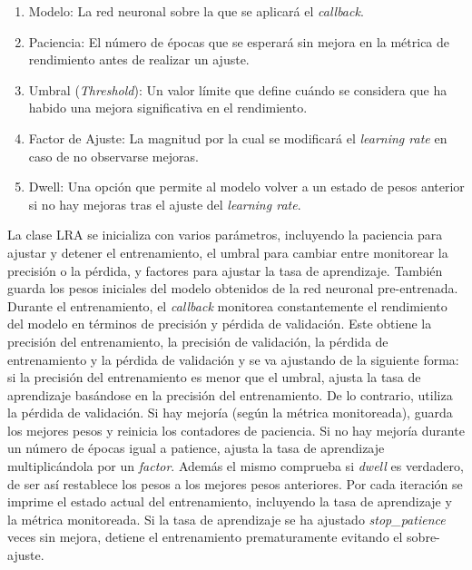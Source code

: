 \begin{enumerate}
   \item Modelo: La red neuronal sobre la que se aplicará el \textit{callback}.
   \item Paciencia: El número de épocas que se esperará sin mejora en la métrica de rendimiento antes de realizar un ajuste.
   \item Umbral (\textit{Threshold}): Un valor límite que define cuándo se considera que ha habido una mejora significativa en el rendimiento.
   \item Factor de Ajuste: La magnitud por la cual se modificará el \textit{learning rate} en caso de no observarse mejoras.
   \item Dwell: Una opción que permite al modelo volver a un estado de pesos anterior si no hay mejoras tras el ajuste del \textit{learning rate}.
\end{enumerate}

La clase LRA se inicializa con varios parámetros, incluyendo la paciencia para ajustar y detener el entrenamiento, el umbral para cambiar entre monitorear la precisión o la pérdida, y factores para ajustar la tasa de aprendizaje. También guarda los pesos iniciales del modelo obtenidos de la red neuronal pre-entrenada. Durante el entrenamiento, el \textit{callback} monitorea constantemente el rendimiento del modelo en términos de precisión y pérdida de validación. Este obtiene la precisión del entrenamiento, la precisión de validación, la pérdida de entrenamiento y la pérdida de validación y se va ajustando de la siguiente forma: si la precisión del entrenamiento es menor que el umbral, ajusta la tasa de aprendizaje basándose en la precisión del entrenamiento. De lo contrario, utiliza la pérdida de validación. Si hay mejoría (según la métrica monitoreada), guarda los mejores pesos y reinicia los contadores de paciencia. Si no hay mejoría durante un número de épocas igual a patience, ajusta la tasa de aprendizaje multiplicándola por un \textit{factor}. Además el mismo comprueba si \textit{dwell} es verdadero, de ser así restablece los pesos a los mejores pesos anteriores. Por cada iteración se imprime el estado actual del entrenamiento, incluyendo la tasa de aprendizaje y la métrica monitoreada. Si la tasa de aprendizaje se ha ajustado \textit{stop\_patience} veces sin mejora, detiene el entrenamiento prematuramente evitando el sobre-ajuste.

